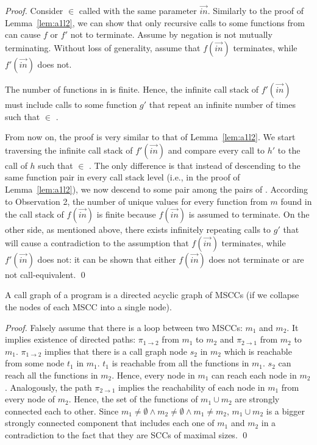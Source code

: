{\begin{proof}
Consider $\in$  called with the same parameter
$\vec{in}$. Similarly to the proof of Lemma~\ref{lem:a1l2}, we can show that only recursive
calls to some functions from  can cause $f$ or $f'$ not to
terminate. Assume by negation  is not mutually terminating. Without
loss of generality, assume that $f(\vec{in})$ terminates, while $f'(\vec{in})$
does not.

The number of functions in  is finite. Hence, the infinite call
stack of $f'(\vec{in})$ must include calls to some function $g'$ that repeat an
infinite number of times such that  $\in$ .

From now on, the proof is very similar to that of Lemma~\ref{lem:a1l2}. We start traversing
the infinite call stack of $f'(\vec{in})$ and compare every call to $h'$ to the
call of $h$ such that  $\in$ . The only difference is
that instead of descending to the same function pair in every call stack level
(i.e.,  in the proof of Lemma~\ref{lem:a1l2}), we now descend to some pair among
the pairs of . According to Observation 2, the number of unique values for
every function from $m$ found in the call stack of $f(\vec{in})$ is finite
because $f(\vec{in})$ is assumed to terminate. On the other side, as mentioned
above, there exists infinitely repeating calls to $g'$ that will cause a
contradiction to the assumption that $f(\vec{in})$ terminates, while
$f'(\vec{in})$ does not: it can be shown that either $f(\vec{in})$ does not
terminate or  are not call-equivalent. \qed \end{proof}

\begin{lemma}\label{lem:a1l4}
A call graph of a program is a directed acyclic graph of MSCCs (if we collapse the nodes of each MSCC into a single node).
\end{lemma}
\begin{proof}
Falsely assume that there is a loop between two MSCCs: $m_1$ and $m_2$. It implies existence of directed paths: $\pi_{1 \rightarrow 2}$ from $m_1$ to $m_2$ and $\pi_{2 \rightarrow 1}$ from $m_2$ to $m_1$. $\pi_{1 \rightarrow 2}$ implies that there is a call graph node $s_2$ in $m_2$ which is reachable from some node $t_1$ in $m_1$. $t_1$ is reachable from all the functions in $m_1$. $s_2$ can reach all the functions in $m_2$. Hence, every node in $m_1$ can reach each node in $m_2$. Analogously, the path $\pi_{2 \rightarrow 1}$ implies the reachability of each node in $m_1$ from every node of $m_2$. Hence, the set of the functions of $m_1 \cup m_2$ are strongly connected each to other. Since $m_1 \neq \emptyset \land m_2 \neq \emptyset \land m_1 \neq m_2$,  $m_1 \cup m_2$ is a bigger strongly connected component that includes each one of $m_1$ and $m_2$ in a contradiction to the fact that they are SCCs of maximal sizes.
\qed
\end{proof}

}
